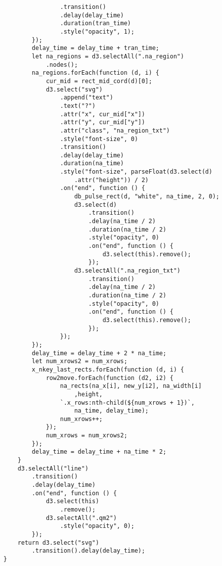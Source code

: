 \begin{lstlisting}
                .transition()
                .delay(delay_time)
                .duration(tran_time)
                .style("opacity", 1);
        });
        delay_time = delay_time + tran_time;
        let na_regions = d3.selectAll(".na_region")
            .nodes();
        na_regions.forEach(function (d, i) {
            cur_mid = rect_mid_cord(d)[0];
            d3.select("svg")
                .append("text")
                .text("?")
                .attr("x", cur_mid["x"])
                .attr("y", cur_mid["y"])
                .attr("class", "na_region_txt")
                .style("font-size", 0)
                .transition()
                .delay(delay_time)
                .duration(na_time)
                .style("font-size", parseFloat(d3.select(d)
                    .attr("height")) / 2)
                .on("end", function () {
                    db_pulse_rect(d, "white", na_time, 2, 0);
                    d3.select(d)
                        .transition()
                        .delay(na_time / 2)
                        .duration(na_time / 2)
                        .style("opacity", 0)
                        .on("end", function () {
                            d3.select(this).remove();
                        });
                    d3.selectAll(".na_region_txt")
                        .transition()
                        .delay(na_time / 2)
                        .duration(na_time / 2)
                        .style("opacity", 0)
                        .on("end", function () {
                            d3.select(this).remove();
                        });
                });
        });
        delay_time = delay_time + 2 * na_time;
        let num_xrows2 = num_xrows;
        x_nkey_last_rects.forEach(function (d, i) {
            row2move.forEach(function (d2, i2) {
                na_rects(na_x[i], new_y[i2], na_width[i]
                    ,height, 
                `.x_rows:nth-child(${num_xrows + 1})`,
                    na_time, delay_time);
                num_xrows++;
            });
            num_xrows = num_xrows2;
        });
        delay_time = delay_time + na_time * 2;
    }
    d3.selectAll("line")
        .transition()
        .delay(delay_time)
        .on("end", function () {
            d3.select(this)
                .remove();
            d3.selectAll(".qm2")
                .style("opacity", 0);
        });
    return d3.select("svg")
        .transition().delay(delay_time);
}


\end{lstlisting}
